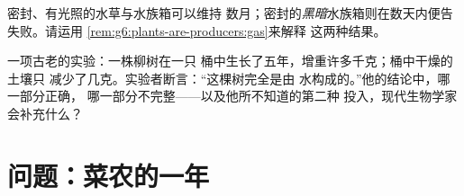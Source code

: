 \begin{exercise}[$\star\star$]\label{exo:g6:plants-are-producers:11}
密封、有光照的水草与水族箱可以维持
数月；密封的\emph{黑暗}水族箱则在数天内便告失败。请运用
\cref{rem:g6:plants-are-producers:gas}来解释
这两种结果。
\end{exercise}

\begin{exercise}[$\star\star\star$]\label{exo:g6:plants-are-producers:12}
一项古老的实验：一株柳树在一只
桶中生长了五年，增重许多千克；桶中干燥的土壤只
减少了几克。实验者断言：“这棵树完全是由
水构成的。”他的结论中，哪一部分正确，
哪一部分不完整——以及他所不知道的第二种
投入，现代生物学家会补充什么？
\end{exercise}

\section{问题：菜农的一年}

